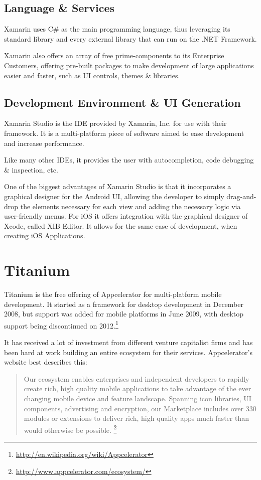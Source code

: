 \subsection{Language \& Services}
Xamarin uses C\# as the main programming language, thus leveraging its standard library and every external library that can run on the .NET Framework.

Xamarin also offers an array of free prime-components to its Enterprise Customers, offering pre-built packages to make development of large applications easier and faster, such as \ac{UI} controls, themes \& libraries.

\subsection{Development Environment \& UI Generation}
Xamarin Studio is the \ac{IDE} provided by Xamarin, Inc. for use with their framework. It is a multi-platform piece of software aimed to ease development and increase performance.

Like many other \ac{IDE}s, it provides the user with autocompletion, code debugging \& inspection, etc.

One of the biggest advantages of Xamarin Studio is that it incorporates a graphical designer for the Android \ac{UI}, allowing the developer to simply drag-and-drop the elements necessary for each view and adding the necessary logic via user-friendly menus. For iOS it offers integration with the graphical designer of Xcode, called XIB Editor. It allows for the same ease of development, when creating iOS Applications. 


\section{Titanium}
Titanium is the free offering of Appcelerator for multi-platform mobile development. It started as a framework for desktop development in December 2008, but support was added for mobile platforms in June 2009, with desktop support being discontinued on 2012.\footnote{\url{http://en.wikipedia.org/wiki/Appcelerator}}

It has received a lot of investment from different venture capitalist firms and has been hard at work building an entire ecosystem for their services. Appcelerator's website best describes this:
\begin{quotation}
Our ecosystem enables enterprises and independent developers to rapidly create rich, high quality mobile applications to take advantage of the ever changing mobile device and feature landscape.
Spanning icon libraries, UI components, advertising and encryption, our Marketplace includes over 330 modules or extensions to deliver rich, high quality apps much faster than would otherwise be possible.
\footnote{\url{http://www.appcelerator.com/ecosystem/}}
\end{quotation}
 

